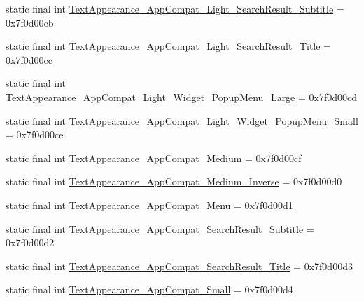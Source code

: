 \begin{DoxyCompactItemize}
\item 
static final int \mbox{\hyperlink{classandroid_1_1support_1_1v7_1_1appcompat_1_1_r_1_1style_a2c3168595fbf5a2f2cd9d11b7f45ad30}{Text\+Appearance\+\_\+\+App\+Compat\+\_\+\+Light\+\_\+\+Search\+Result\+\_\+\+Subtitle}} = 0x7f0d00cb
\item 
static final int \mbox{\hyperlink{classandroid_1_1support_1_1v7_1_1appcompat_1_1_r_1_1style_a62fb7764d0faa33424e637094f9874ed}{Text\+Appearance\+\_\+\+App\+Compat\+\_\+\+Light\+\_\+\+Search\+Result\+\_\+\+Title}} = 0x7f0d00cc
\item 
static final int \mbox{\hyperlink{classandroid_1_1support_1_1v7_1_1appcompat_1_1_r_1_1style_a148472e911d0046b356b15cfc12dfa3a}{Text\+Appearance\+\_\+\+App\+Compat\+\_\+\+Light\+\_\+\+Widget\+\_\+\+Popup\+Menu\+\_\+\+Large}} = 0x7f0d00cd
\item 
static final int \mbox{\hyperlink{classandroid_1_1support_1_1v7_1_1appcompat_1_1_r_1_1style_aab3ede0d3b744bbff6ea1fd27f8d6b3c}{Text\+Appearance\+\_\+\+App\+Compat\+\_\+\+Light\+\_\+\+Widget\+\_\+\+Popup\+Menu\+\_\+\+Small}} = 0x7f0d00ce
\item 
static final int \mbox{\hyperlink{classandroid_1_1support_1_1v7_1_1appcompat_1_1_r_1_1style_a772ffada512c435e31ffaebade3ed642}{Text\+Appearance\+\_\+\+App\+Compat\+\_\+\+Medium}} = 0x7f0d00cf
\item 
static final int \mbox{\hyperlink{classandroid_1_1support_1_1v7_1_1appcompat_1_1_r_1_1style_a8fa231cf7e54979201ef2a3fb3b336b0}{Text\+Appearance\+\_\+\+App\+Compat\+\_\+\+Medium\+\_\+\+Inverse}} = 0x7f0d00d0
\item 
static final int \mbox{\hyperlink{classandroid_1_1support_1_1v7_1_1appcompat_1_1_r_1_1style_a22812bea24f97e75e0f4a149ace3e8e9}{Text\+Appearance\+\_\+\+App\+Compat\+\_\+\+Menu}} = 0x7f0d00d1
\item 
static final int \mbox{\hyperlink{classandroid_1_1support_1_1v7_1_1appcompat_1_1_r_1_1style_abc8d67744de25dad47ee20f7558b9e61}{Text\+Appearance\+\_\+\+App\+Compat\+\_\+\+Search\+Result\+\_\+\+Subtitle}} = 0x7f0d00d2
\item 
static final int \mbox{\hyperlink{classandroid_1_1support_1_1v7_1_1appcompat_1_1_r_1_1style_a2bb5c5d5e65b3e1c48527de626155a79}{Text\+Appearance\+\_\+\+App\+Compat\+\_\+\+Search\+Result\+\_\+\+Title}} = 0x7f0d00d3
\item 
static final int \mbox{\hyperlink{classandroid_1_1support_1_1v7_1_1appcompat_1_1_r_1_1style_a2f18b3bec0af714ec2cbe27b8dc88310}{Text\+Appearance\+\_\+\+App\+Compat\+\_\+\+Small}} = 0x7f0d00d4

\end{DoxyCompactItemize}
